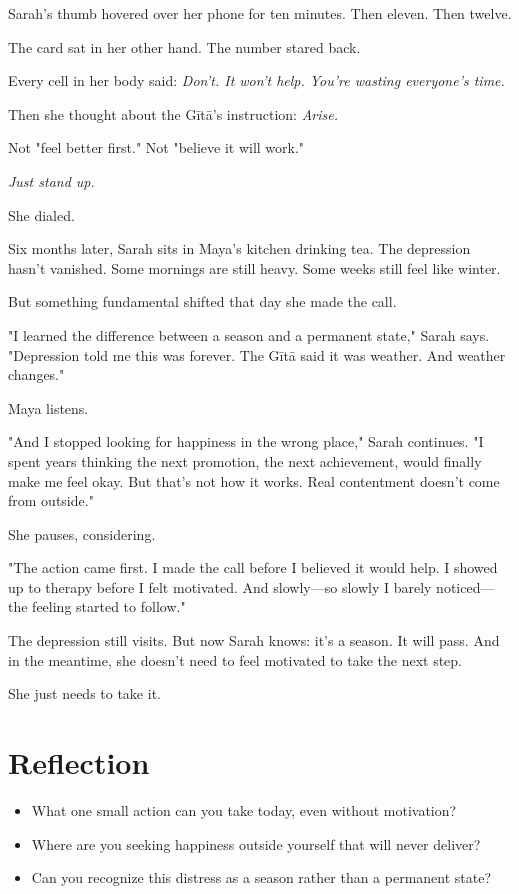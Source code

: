 \documentclass[11pt,twoside]{book}
\begin{document}
Sarah's thumb hovered over her phone for ten minutes. Then eleven. Then twelve.

The card sat in her other hand. The number stared back.

Every cell in her body said: \textit{Don't. It won't help. You're wasting everyone's time.}

Then she thought about the Gītā's instruction: \textit{Arise.}

Not "feel better first." Not "believe it will work."

\textit{Just stand up.}

She dialed.

Six months later, Sarah sits in Maya's kitchen drinking tea. The depression hasn't vanished. Some mornings are still heavy. Some weeks still feel like winter.

But something fundamental shifted that day she made the call.

"I learned the difference between a season and a permanent state," Sarah says. "Depression told me this was forever. The Gītā said it was weather. And weather changes."

Maya listens.

"And I stopped looking for happiness in the wrong place," Sarah continues. "I spent years thinking the next promotion, the next achievement, would finally make me feel okay. But that's not how it works. Real contentment doesn't come from outside."

She pauses, considering.

"The action came first. I made the call before I believed it would help. I showed up to therapy before I felt motivated. And slowly—so slowly I barely noticed—the feeling started to follow."

The depression still visits. But now Sarah knows: it's a season. It will pass. And in the meantime, she doesn't need to feel motivated to take the next step.

She just needs to take it.

\section*{Reflection}

\begin{itemize}
\item What one small action can you take today, even without motivation?
\item Where are you seeking happiness outside yourself that will never deliver?
\item Can you recognize this distress as a season rather than a permanent state?
\end{itemize}
\end{document}

